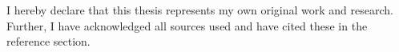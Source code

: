 I hereby declare that this thesis represents my own original work and research. Further, I have acknowledged all sources used and have cited these in the reference section.